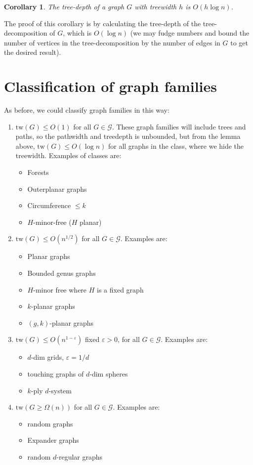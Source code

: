 \documentclass[]{article}
\newcommand{\tw}{\text{tw}}
\newtheorem{corollary}[theorem]{Corollary}
\theoremstyle{definition}
\numberwithin{theorem}{section}
\numberwithin{equation}{section}
\begin{document}
\begin{corollary}
	The tree-depth of a graph $G$ with treewidth $h$ is $O(h \log n)$.
\end{corollary}
The proof of this corollary is by calculating the tree-depth of the tree-decomposition of $G$, which is $O(\log n)$ (we may fudge numbers and bound the number of vertices in the tree-decomposition by the number of edges in $G$ to get the desired result).

\section{Classification of graph families}
As before, we could classify graph families in this way:
\begin{enumerate}
	\item $\tw(G) \leq O(1)$ for all $G \in \mathcal{G}$. These graph families will include trees and paths, so the pathwidth and treedepth is unbounded, but from the lemma above, $\tw(G) \leq O(\log n)$ for all graphs in the class, where we hide the treewidth. Examples of classes are:
	\begin{itemize}
		\item Forests
		\item Outerplanar graphs
		\item Circumference $\leq k$
		\item $H$-minor-free ($H$ planar)
	\end{itemize}
	\item $\tw(G) \leq O(n^{1/2})$ for all $G \in \mathcal{G}$. Examples are:
	\begin{itemize}
		\item Planar graphs
		\item Bounded genus graphs
		\item $H$-minor free where $H$ is a fixed graph
		\item $k$-planar graphs
		\item $(g, k)$-planar graphs
	\end{itemize}
	\item $\tw(G) \leq O(n^{1- \varepsilon})$ fixed $\varepsilon > 0$, for all $G \in \mathcal{G}$. Examples are:
	\begin{itemize}
	\item $d$-dim grids, $\varepsilon = 1/d$
	\item touching graphs of $d$-dim spheres
	\item $k$-ply $d$-system
	\end{itemize}
	\item $\tw(G \geq \Omega(n))$ for all $G \in \mathcal{G}$. Examples are:
	\begin{itemize}
	\item random graphs
	\item Expander graphs
	\item random $d$-regular graphs
	\end{itemize}
\end{enumerate}
\end{document}

